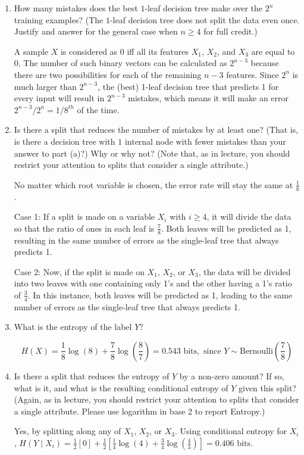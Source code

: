 \documentclass[11pt]{article}
\newcommand{\sol}[1]{{\bf{\color{magenta}{{Solution:}}}}}
\begin{document}
\begin{enumerate}
\item {} How many mistakes does the best $1$-leaf decision tree make over the $2^n$ training examples? (The $1$-leaf decision tree does not split the data even once. Justify and answer for the general case when $n \geq 4$ for full credit.)

\sol  x A sample $X$ is considered as 0 iff all its features $X_1$, $X_2$, and $X_3$ are equal to $0$. The number of such binary vectors can be calculated as $2^{n-3}$ because there are two possibilities for each of the remaining $n-3$ features. Since $2^n$ is much larger than $2^{n-3}$, the (best) 1-leaf decision tree that predicts 1 for every input will result in $2^{n-3}$ mistakes, which means it will make an error $2^{n-3}/2^n = 1/8^{th}$ of the time.

\item {} Is there a split that reduces the number of mistakes by at least one? (That is, is there a decision tree with $1$ internal node with fewer mistakes than your answer to part (a)?)  Why or why not? (Note that, as in lecture, you should restrict your attention to splits that consider a single attribute.)

\sol x No matter which root variable is chosen, the error rate will stay the same at $\frac{1}{8}$. 

Case 1: If a split is made on a variable $X_i$ with $i \geq 4$, it will divide the data so that the ratio of ones in each leaf is $\frac{7}{8}$. Both leaves will be predicted as 1, resulting in the same number of errors as the single-leaf tree that always predicts 1. 

Case 2: Now, if the split is made on $X_1$, $X_2$, or $X_3$, the data will be divided into two leaves with one containing only 1's and the other having a 1's ratio of $\frac{3}{4}$. In this instance, both leaves will be predicted as 1, leading to the same number of errors as the single-leaf tree that always predicts 1.

\item {} What is the entropy of the label $Y$?

\sol x $$H(X) = \frac{1}{8} \log(8) + \frac{7}{8} \log\left(\frac{8}{7}\right) = 0.543 \text{ bits}, \text{ since } Y \sim \text{Bernoulli}(\frac{7}{8})$$

\item {} Is there a split that reduces the entropy of $Y$ by a non-zero amount? If so, what is it, and what is the resulting conditional entropy of $Y$ given this split? (Again, as in lecture, you should restrict your attention to splits that consider a single attribute. Please use logarithm in base 2 to report Entropy.)

\sol x Yes, by splitting along any of $X_1$, $X_2$, or $X_3$. Using conditional entropy for $X_i$, $H(Y \mid X_i) = \frac{1}{2}[0] + \frac{1}{2}\left[\frac{1}{4} \log(4) + \frac{3}{4} \log\left(\frac{4}{3}\right)\right] = 0.406 \text{ bits}$.

\end{enumerate}
\end{document}
